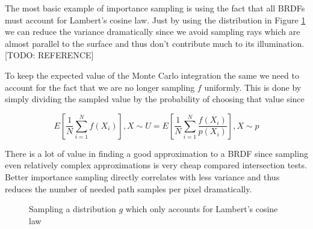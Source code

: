 \documentclass{ACGSeminar}
\begin{document}
The most basic example of importance sampling is using the fact that all BRDFs must account for Lambert's cosine law. Just by using the distribution in Figure \ref{fig:cosine-dist} we can reduce the variance dramatically since we avoid sampling rays which are almost parallel to the surface and thus don't contribute much to its illumination. [TODO: REFERENCE]

To keep the expected value of the Monte Carlo integration the same we need to account for the fact that we are no longer sampling $f$ uniformly. This is done by simply dividing the sampled value by the probability of choosing that value since

\begin{equation}
E[\frac{1}{N} \sum_{i=1}^{N} f(X_i)], X \sim U = E[\frac{1}{N} \sum_{i=1}^{N} \frac{f(X_i)}{p(X_i)}], X \sim p
\end{equation}

There is a lot of value in finding a good approximation to a BRDF since sampling even relatively complex approximations is very cheap compared intersection tests. Better importance sampling directly correlates with less variance and thus reduces the number of needed path samples per pixel dramatically.

\begin{figure}[htb!]
  \begin{centering}
  \par
  \end{centering}
  \caption{Sampling a distribution $g$ which only accounts for Lambert's cosine law}
  \label{fig:cosine-dist}
\end{figure}
\end{document}
